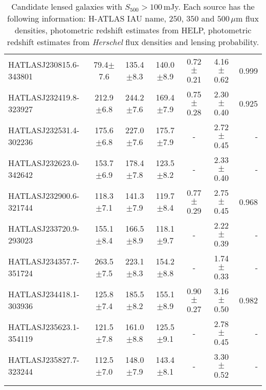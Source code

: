 \begin{landscape}
\begin{longtable}[h!]{lcccccr}
    HATLASJ230815.6-343801 & 79.4$\pm$7.6 & 135.4$\pm$8.3 & 140.0$\pm$8.9 & 0.72$\pm$0.21 & 4.16$\pm$0.62 & 0.999 \\
    HATLASJ232419.8-323927 & 212.9$\pm$6.8 & 244.2$\pm$7.6 & 169.4$\pm$7.9 & 0.75$\pm$0.28 & 2.30$\pm$0.40 & 0.925 \\
    HATLASJ232531.4-302236 & 175.6$\pm$6.8 & 227.0$\pm$7.6 & 175.7$\pm$7.9 & - & 2.72$\pm$0.45 & - \\
    HATLASJ232623.0-342642 & 153.7$\pm$6.9 & 178.4$\pm$7.8 & 123.5$\pm$8.2 & - & 2.33$\pm$0.40 & - \\
    HATLASJ232900.6-321744 & 118.3$\pm$7.1 & 141.3$\pm$7.9 & 119.7$\pm$8.4 & 0.77$\pm$0.29 & 2.75$\pm$0.45 & 0.968 \\
    HATLASJ233720.9-293023 & 155.1$\pm$8.4 & 166.5$\pm$8.9 & 118.1$\pm$9.7 & - & 2.22$\pm$0.39 & - \\
    HATLASJ234357.7-351724 & 263.5$\pm$7.5 & 223.1$\pm$8.3 & 154.2$\pm$8.8 & - & 1.74$\pm$0.33 & - \\
    HATLASJ234418.1-303936 & 125.8$\pm$7.4 & 185.5$\pm$8.2 & 155.1$\pm$8.9 & 0.90$\pm$0.27 & 3.16$\pm$0.50 & 0.982 \\
    HATLASJ235623.1-354119 & 121.5$\pm$7.8 & 161.0$\pm$8.8 & 125.5$\pm$9.1 & - & 2.78$\pm$0.45 & - \\
    HATLASJ235827.7-323244 & 112.5$\pm$7.0 & 148.0$\pm$7.9 & 143.4$\pm$8.1 & - & 3.30$\pm$0.52 & - \\
    \hline
    \hline
    \caption{Candidate lensed galaxies with $S_{500} > 100\,$mJy. Each source has the following information: H-ATLAS IAU name, $250$, $350$ and $500\,\mu$m flux densities, photometric redshift estimates from HELP, photometric redshift estimates from \textit{Herschel} flux densities and lensing probability.}
	\label{tab:SLG_candidates}
\end{longtable}
\end{landscape}
